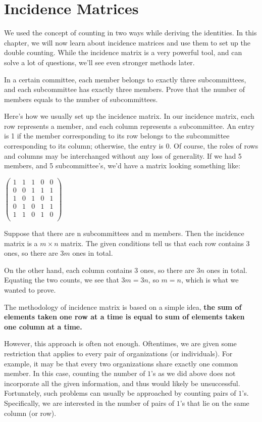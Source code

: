 \section{Incidence Matrices}
We used the concept of counting in two ways while deriving the identities. In this chapter, we will now learn about incidence matrices and use them to set up the double counting. While the incidence matrix is a very powerful tool, and can solve a lot of questions, we'll see even stronger methods later.\par
\begin{example}
In a certain committee, each member belongs to exactly three subcommittees, and each subcommittee has exactly three members. Prove that the number of members equals to the number of subcommittees.
\end{example}
Here’s how we usually set up the incidence matrix. In our incidence matrix, each row represents a member, and each column represents a subcommittee. An entry is 1 if the member corresponding to its row belongs to the subcommittee corresponding to its column; otherwise, the entry is 0. Of course, the roles of rows and columns may be interchanged without any loss of generality. If we had 5 members,  and 5 subcommittee's, we'd have a matrix looking something like:\par
$\begin{pmatrix}
1 & 1 & 1 & 0 & 0 \\
0 & 0 & 1 & 1 & 1 \\
1 & 0 & 1 & 0 & 1 \\
0 & 1 & 0 & 1 & 1 \\
1 & 1 & 0 & 1 & 0 \\
\end{pmatrix}$\par
Suppose that there are n subcommittees and m members. Then the incidence matrix is a $m \times n$ matrix. The given conditions tell us that each row contains 3 ones, so there are $3m$ ones in total.\par
On the other hand, each column contains 3 ones, so there are $3n$ ones in total. Equating the two counts, we see that $3m = 3n$, so $m = n$, which is what we wanted to prove.\par
The methodology of incidence matrix is based on a simple idea, \textbf{the sum of elements taken one row at a time is equal to sum of elements taken one column at a time.}\par
However, this approach is often not enough. Oftentimes, we are given some restriction that applies to every pair of organizations (or individuals). For example, it may be that every two organizations share exactly one common member. In this case, counting the number of $1$’s as we did above does not incorporate all the given information, and thus would likely be unsuccessful. Fortunately, such problems can usually be approached by counting pairs of $1$’s. Specifically, we are interested in the number of pairs of $1$’s that lie on the same column (or row).\par
